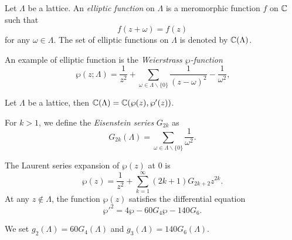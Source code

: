 \begin{definition}
  Let $\Lambda$ be a lattice. An
  \emph{elliptic function} on $\Lambda$ is a
  meromorphic function $f$ on $\mathbb{C}$ such that
  \begin{equation}
    \label{eq:141}
    f(z+\omega) = f(z)
  \end{equation}
  for any $\omega\in\Lambda$.  The set of elliptic functions on
  $\Lambda$ is denoted by $\mathbb{C}(\Lambda)$.
\end{definition}

An example of elliptic function is the
\emph{Weierstrass
  $\wp$-function}
\begin{equation}
  \label{eq:142}
  \wp(z;\Lambda) = \frac{1}{z^2} + \sum_{\omega\in\Lambda\backslash\{0\}}\frac{1}{(z-\omega)^2}-\frac{1}{\omega^2}
  \text{,}
\end{equation}
\begin{theorem}
  Let $\Lambda$ be a lattice, then $\mathbb{C}(\Lambda) = \mathbb{C}(\wp(z),\wp'(z))$.
\end{theorem}

For $k>1$, we define the \emph{Eisenstein
  series} $G_{2k}$ as
\begin{equation}
  \label{eq:143}
  G_{2k}(\Lambda) = \sum_{\omega\in\Lambda\backslash\{0\}}\frac{1}{\omega^2}
  \text{.}
\end{equation}

\begin{theorem}
  The Laurent series expansion of $\wp(z)$ at $0$ is
  \begin{equation}
    \label{eq:144}
    \wp(z) = \frac{1}{z^2} + \sum_{k=1}^\infty (2k+1)G_{2k+2}z^{2k}
    \text{.}
  \end{equation}
  At any $z\not\in\Lambda$, the function $\wp(z)$ satisfies the
  differential equation
  \begin{equation}
    \label{eq:145}
    {\wp'}^2 = 4\wp - 60G_4\wp - 140G_6
    \text{.}
  \end{equation}
\end{theorem}

We set $g_2(\Lambda)=60G_4(\Lambda)$ and $g_3(\Lambda)=140G_6(\Lambda)$.

